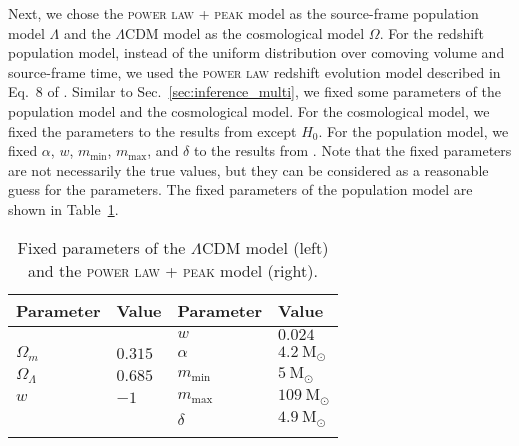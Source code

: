 \documentclass[sn-aps, pdflatex, iicol]{sn-jnl}
\begin{document}
Next, we chose the \textsc{power law + peak} model as the source-frame population model $\Lambda$ and the $\Lambda$CDM model as the cosmological model $\Omega$.
For the redshift population model, instead of the uniform distribution over comoving volume and source-frame time, we used the \textsc{power law} redshift evolution model described in Eq.~8 of \cite{KAGRA:2021duu}.
Similar to Sec.~\ref{sec:inference_multi}, we fixed some parameters of the population model and the cosmological model.
For the cosmological model, we fixed the parameters to the results from \cite{Planck:2018vyg} except $H_0$.
For the population model, we fixed $\alpha$, $w$, $m_\mathrm{min}$, $m_\mathrm{max}$, and $\delta$ to the results from \cite{LIGOScientific:2021aug}.
Note that the fixed parameters are not necessarily the true values, but they can be considered as a reasonable guess for the parameters.
The fixed parameters of the population model are shown in Table~\ref{tab:fixed_parameters}.
\begin{table}
    \caption{Fixed parameters of the $\Lambda$CDM model (left) and the \textsc{power law + peak} model (right).}
    \begin{tabularx}{\linewidth}{>{\centering\arraybackslash}X >{\centering\arraybackslash}X | >{\centering\arraybackslash}X >{\centering\arraybackslash}X}
        \toprule
        Parameter & Value & Parameter & Value \\
        \midrule
         & & $w$ & $0.024$ \\
        $\Omega_m$ & $0.315$ & $\alpha$ & $4.2\ \mathrm{M}_\odot$ \\
        $\Omega_\Lambda$ & $0.685$ & $m_\mathrm{min}$ & $5\ \mathrm{M}_\odot$ \\
        $w$ & $-1$ & $m_\mathrm{max}$ & $109\ \mathrm{M}_\odot$ \\
         & & $\delta$ & $4.9\ \mathrm{M}_\odot$ \\
        \botrule
    \end{tabularx}
    \label{tab:fixed_parameters}
\end{table}
\end{document}
